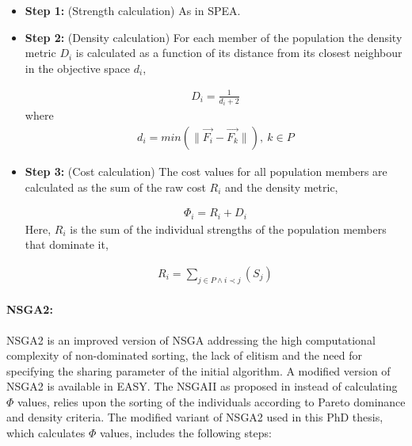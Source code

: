 \begin{itemize}
\item[]{\bf Step 1:}  (Strength calculation) As in SPEA.

\item[]{\bf Step 2:}  (Density calculation) For each member of the population the density metric $D_i$ is calculated  as a function of its distance from its closest neighbour in the objective space $d_i$,

\begin{eqnarray}
	D_i = \frac{1} {d_i+2} 
\end{eqnarray}
where
\begin{eqnarray}
	\nonumber
	d_i= min (\parallel \vec{F_i} - \vec{F_k} \parallel), ~ k \in P  
\end{eqnarray}


\item[]{\bf Step 3:}  (Cost calculation) The cost values for all population members are calculated as the sum of the raw cost $R_i$ and the density metric,

\begin{eqnarray}
	\Phi_i = R_i+D_i
\label{SPEAIIeq}
\end{eqnarray}
Here, $R_i$ is the sum of the individual strengths of the population members that dominate it,
  
\begin{eqnarray}
	\nonumber
	R_i=\sum _{j \in P \wedge i \prec j}(S_j)  
\end{eqnarray}  
\end{itemize}

\paragraph{NSGA2:} 
NSGA2 \cite{Deb00a} is an improved version of NSGA \cite{Sri1995} addressing the high computational complexity of non-dominated sorting, the lack of elitism and the need for specifying the sharing parameter of the initial algorithm. A modified version of NSGA2 is available in EASY. The NSGAII as proposed in \cite{Deb00a} instead of calculating $\Phi$ values, relies upon the sorting of the individuals according to Pareto dominance and density criteria. The modified variant of NSGA2 used in this PhD thesis, which calculates $\Phi$ values, includes the following steps:    



